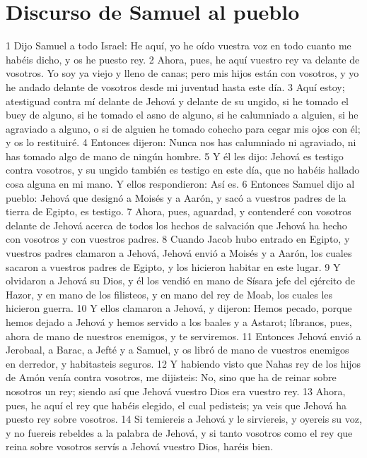 \section*{Discurso de Samuel al pueblo}


1 Dijo Samuel a todo Israel: He aquí, yo he oído vuestra voz en todo cuanto me habéis dicho, y os he puesto rey.
2 Ahora, pues, he aquí vuestro rey va delante de vosotros. Yo soy ya viejo y lleno de canas; pero mis hijos están con vosotros, y yo he andado delante de vosotros desde mi juventud hasta este día.
3 Aquí estoy; atestiguad contra mí delante de Jehová y delante de su ungido, si he tomado el buey de alguno, si he tomado el asno de alguno, si he calumniado a alguien, si he agraviado a alguno, o si de alguien he tomado cohecho para cegar mis ojos con él; y os lo restituiré.
4 Entonces dijeron: Nunca nos has calumniado ni agraviado, ni has tomado algo de mano de ningún hombre.
5 Y él les dijo: Jehová es testigo contra vosotros, y su ungido también es testigo en este día, que no habéis hallado cosa alguna en mi mano. Y ellos respondieron: Así es.
6 Entonces Samuel dijo al pueblo: Jehová que designó a Moisés y a Aarón, y sacó a vuestros padres de la tierra de Egipto, es testigo.
7 Ahora, pues, aguardad, y contenderé con vosotros delante de Jehová acerca de todos los hechos de salvación que Jehová ha hecho con vosotros y con vuestros padres.
8 Cuando Jacob hubo entrado en Egipto, y vuestros padres clamaron a Jehová, Jehová envió a Moisés y a Aarón, los cuales sacaron a vuestros padres de Egipto, y los hicieron habitar en este lugar.
9 Y olvidaron a Jehová su Dios, y él los vendió en mano de Sísara jefe del ejército de Hazor, y en mano de los filisteos, y en mano del rey de Moab, los cuales les hicieron guerra.
10 Y ellos clamaron a Jehová, y dijeron: Hemos pecado, porque hemos dejado a Jehová y hemos servido a los baales y a Astarot; líbranos, pues, ahora de mano de nuestros enemigos, y te serviremos. 
11 Entonces Jehová envió a Jerobaal, a Barac, a Jefté y a Samuel, y os libró de mano de vuestros enemigos en derredor, y habitasteis seguros.
12 Y habiendo visto que Nahas rey de los hijos de Amón venía contra vosotros, me dijisteis: No, sino que ha de reinar sobre nosotros un rey; siendo así que Jehová vuestro Dios era vuestro rey.
13 Ahora, pues, he aquí el rey que habéis elegido, el cual pedisteis; ya veis que Jehová ha puesto rey sobre vosotros.
14 Si temiereis a Jehová y le sirviereis, y oyereis su voz, y no fuereis rebeldes a la palabra de Jehová, y si tanto vosotros como el rey que reina sobre vosotros servís a Jehová vuestro Dios, haréis bien.

